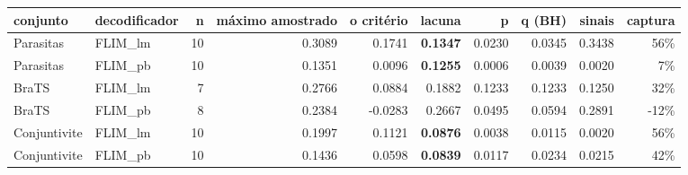 \begin{adjustbox}{max width=\linewidth}
\begin{tabular}{llrrrrrrrr}
\toprule
conjunto & decodificador & n & máximo amostrado & o critério & lacuna & p & q (BH) & sinais & captura \\
\midrule
Parasitas & FLIM\_lm & 10 & 0.3089 & 0.1741 & \textbf{0.1347} & 0.0230 & 0.0345 & 0.3438 & 56\% \\
Parasitas & FLIM\_pb & 10 & 0.1351 & 0.0096 & \textbf{0.1255} & 0.0006 & 0.0039 & 0.0020 & 7\% \\
BraTS & FLIM\_lm & 7 & 0.2766 & 0.0884 & 0.1882 & 0.1233 & 0.1233 & 0.1250 & 32\% \\
BraTS & FLIM\_pb & 8 & 0.2384 & -0.0283 & 0.2667 & 0.0495 & 0.0594 & 0.2891 & -12\% \\
Conjuntivite & FLIM\_lm & 10 & 0.1997 & 0.1121 & \textbf{0.0876} & 0.0038 & 0.0115 & 0.0020 & 56\% \\
Conjuntivite & FLIM\_pb & 10 & 0.1436 & 0.0598 & \textbf{0.0839} & 0.0117 & 0.0234 & 0.0215 & 42\% \\
\bottomrule
\end{tabular}
\end{adjustbox}
